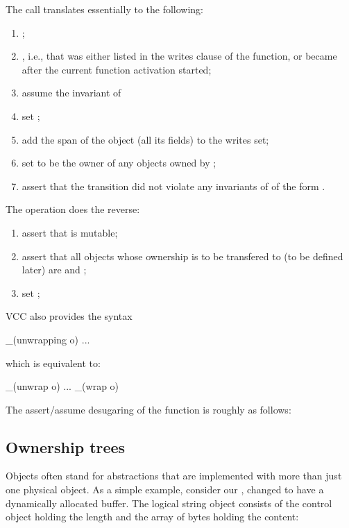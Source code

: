 The call 
translates essentially to the following:
\begin{enumerate}
\item {};
\item {}, i.e., that  was either
  listed in the writes clause of the function, or became \vcc{\wrapped}
  after the current function activation started;
\item assume the invariant of 
\item set ;
\item add the span of the object (\ie all its fields) to the writes
  set;
\item set \vcc{\me} to be the owner of any objects owned by ;
\item assert that the transition did not violate any invariants of
   of the form .
\end{enumerate}
The operation  does the reverse:
\begin{enumerate}
\item
assert that  is mutable;
\item
assert that all objects whose ownership is to be transfered to 
(to be defined later) are \vcc{\wrapped} and \vcc{\writable};
\item set ;
\end{enumerate}
VCC also provides the syntax 
\begin{VCC}
_(unwrapping o) { ... }
\end{VCC}
which is equivalent to:
\begin{VCC}
_(unwrap o) { ... } _(wrap o)
\end{VCC}

The assert\slash assume desugaring of the 
function is roughly as follows:


\subsection{Ownership trees}
\label{sect:ownership}

Objects often stand for abstractions that are implemented with more
than just one physical object.  As a simple example, consider our
, changed to have a dynamically allocated buffer.  The
logical string object consists of the control object holding the
length and the array of bytes holding the content:

